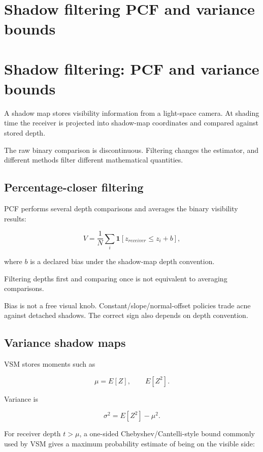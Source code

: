 \hypertarget{appendix-7cac8a689849}{}
\section*{Shadow filtering PCF and variance bounds}
\section{Shadow filtering: PCF and variance bounds}\label{shadow-filtering-pcf-and-variance-bounds}

A shadow map stores visibility information from a light-space camera. At shading time the receiver is projected into shadow-map coordinates and compared against stored depth.

The raw binary comparison is discontinuous. Filtering changes the estimator, and different methods filter different mathematical quantities.

\subsection{Percentage-closer filtering}\label{percentage-closer-filtering}

PCF performs several depth comparisons and averages the binary visibility results:

\[
V=
\frac{1}{N}
\sum_i
\mathbf 1[z_{receiver}\le z_i+b],
\]

where \(b\) is a declared bias under the shadow-map depth convention.

Filtering depths first and comparing once is not equivalent to averaging comparisons.

Bias is not a free visual knob. Constant/slope/normal-offset policies trade acne against detached shadows. The correct sign also depends on depth convention.

\subsection{Variance shadow maps}\label{variance-shadow-maps}

VSM stores moments such as

\[
\mu=E[Z],
\qquad
E[Z^2].
\]

Variance is

\[
\sigma^2=E[Z^2]-\mu^2.
\]

For receiver depth \(t>\mu\), a one-sided Chebyshev/Cantelli-style bound commonly used by VSM gives a maximum probability estimate of being on the visible side:

